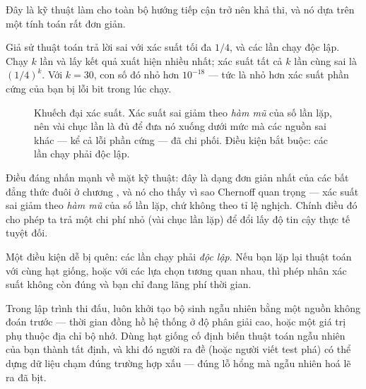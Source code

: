 \documentclass[../../algorithm.tex]{subfiles}
\begin{document}
Đây là kỹ thuật làm cho toàn bộ hướng tiếp cận trở nên khả thi, và nó dựa trên một tính toán rất đơn giản.

Giả sử thuật toán trả lời sai với xác suất tối đa \(1/4\), và các lần chạy độc lập. Chạy \(k\) lần và lấy kết quả xuất hiện nhiều nhất; xác suất tất cả \(k\) lần cùng sai là \((1/4)^k\). Với \(k = 30\), con số đó nhỏ hơn \(10^{-18}\) --- tức là nhỏ hơn xác suất phần cứng của bạn bị lỗi bit trong lúc chạy.

\begin{figure}[H]\centering
{}
\caption{Khuếch đại xác suất. Xác suất sai giảm theo \emph{hàm mũ} của số lần lặp, nên vài chục lần là đủ để đưa nó xuống dưới mức mà các nguồn sai khác --- kể cả lỗi phần cứng --- đã chi phối. Điều kiện bắt buộc: các lần chạy phải độc lập.}
\label{fig:amplify}
\end{figure}

Điều đáng nhấn mạnh về mặt kỹ thuật: đây là dạng đơn giản nhất của các bất đẳng thức đuôi ở chương , và nó cho thấy vì sao Chernoff quan trọng --- xác suất sai giảm theo \emph{hàm mũ} của số lần lặp, chứ không theo tỉ lệ nghịch. Chính điều đó cho phép ta trả một chi phí nhỏ (vài chục lần lặp) để đổi lấy độ tin cậy thực tế tuyệt đối.

Một điều kiện dễ bị quên: các lần chạy phải \emph{độc lập}. Nếu bạn lặp lại thuật toán với cùng hạt giống, hoặc với các lựa chọn tương quan nhau, thì phép nhân xác suất không còn đúng và bạn chỉ đang lãng phí thời gian.

\begin{cannho}
Trong lập trình thi đấu, luôn khởi tạo bộ sinh ngẫu nhiên bằng một nguồn không đoán trước --- thời gian đồng hồ hệ thống ở độ phân giải cao, hoặc một giá trị phụ thuộc địa chỉ bộ nhớ. Dùng hạt giống cố định biến thuật toán ngẫu nhiên của bạn thành tất định, và khi đó người ra đề (hoặc người viết test phá) có thể dựng dữ liệu chạm đúng trường hợp xấu --- đúng lỗ hổng mà ngẫu nhiên hoá lẽ ra đã bịt.
\end{cannho}
\end{document}
